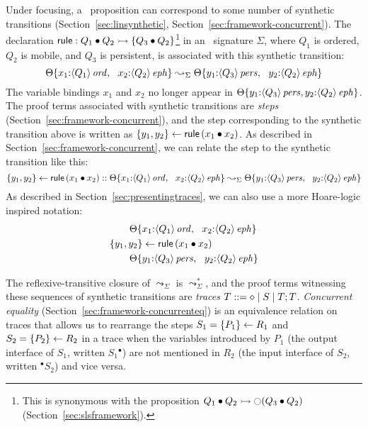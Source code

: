 Under focusing, a \sls~proposition can correspond to some number of
synthetic transitions (Section~\ref{sec:linsynthetic},
Section~\ref{sec:framework-concurrent}). The declaration ${\sf rule} :
Q_1 \mathbin{\bullet} Q_2 \rightarrowtail \{ Q_3 \mathbin{\bullet} Q_2 \}$\footnote{This is
  synonymous with the proposition $Q_1 \mathbin{\bullet} Q_2 \rightarrowtail
  {\ocircle}(Q_3 \mathbin{\bullet} Q_2)$ (Section~\ref{sec:slsframework}).}  in an
\sls~signature $\Sigma$, where $Q_1$ is ordered, $Q_2$ is mobile, and
$Q_3$ is persistent, is associated with this synthetic transition:
\[
{\Theta}\{{x_1{:}{\langle {Q_1} \rangle}\,{{\it ord}}, ~~ 
                x_2{:}{\langle {Q_2} \rangle}\,{{\it eph}}}\} 
 \leadsto_\Sigma
{\Theta}\{{y_1{:}{\langle {Q_3} \rangle}\,{{\it pers}}, ~~
                y_2{:}{\langle {Q_2} \rangle}\,{{\it eph}}}\}
\]
The variable bindings $x_1$ and $x_2$ no longer appear in
${\Theta}\{{y_1{:}{\langle {Q_3} \rangle}\,{{\it pers}},
  y_2{:}{\langle {Q_2} \rangle}\,{{\it eph}}}\}$. The proof terms associated with
synthetic transitions are {\it steps}
(Section~\ref{sec:framework-concurrent}), and the step corresponding
to the synthetic transition above is written as $\{{y_1,
  y_2}\} \leftarrow {{\sf rule}\,({x_1} \mathbin{\bullet}{x_2})}$. As described in
Section~\ref{sec:framework-concurrent}, we can relate the step to the
synthetic transition like this:
\[
\{{y_1, y_2}\} \leftarrow {{\sf
    rule}\,({x_1} \mathbin{\bullet}{x_2})}
::
{\Theta}\{{x_1{:}{\langle {Q_1} \rangle}\,{{\it ord}}, ~~ 
                x_2{:}{\langle {Q_2} \rangle}\,{{\it eph}}}\} 
 \leadsto_\Sigma
{\Theta}\{{y_1{:}{\langle {Q_3} \rangle}\,{{\it pers}}, ~~
                y_2{:}{\langle {Q_2} \rangle}\,{{\it eph}}}\}
\]
As described in Section~\ref{sec:presentingtraces}, we can also use
a more Hoare-logic inspired notation:
\begin{align*}
&\qquad
{\Theta}\{{x_1{:}{\langle {Q_1} \rangle}\,{{\it ord}}, ~~ 
                x_2{:}{\langle {Q_2} \rangle}\,{{\it eph}}}\} 
\\
&\{{y_1, y_2}\} \leftarrow {{\sf
    rule}\,({x_1} \mathbin{\bullet}{x_2})}
\\
&\qquad
{\Theta}\{{y_1{:}{\langle {Q_3} \rangle}\,{{\it pers}}, ~~
                y_2{:}{\langle {Q_2} \rangle}\,{{\it eph}}}\}
\end{align*}

The reflexive-transitive closure of $\leadsto_{\Sigma}$ is
$\leadsto^*_{\Sigma}$, and the proof terms witnessing these sequences
of synthetic transitions are {\it traces} $T ::= \diamond \mid S
\mid T; T$.  {\it Concurrent equality} (Section~\ref{sec:framework-concurrenteq}) is an equivalence relation on
traces that allows us to rearrange the steps $S_1 = \{{P_1}\} \leftarrow {R_1}$
and $S_2 = \{{P_2}\} \leftarrow {R_2}$ in a trace when the variables introduced
by $P_1$ (the output interface of $S_1$, written $S_1{^\bullet}$) are
not mentioned in $R_2$ (the input interface of $S_2$, written
${^\bullet}S_2$) and vice versa.

